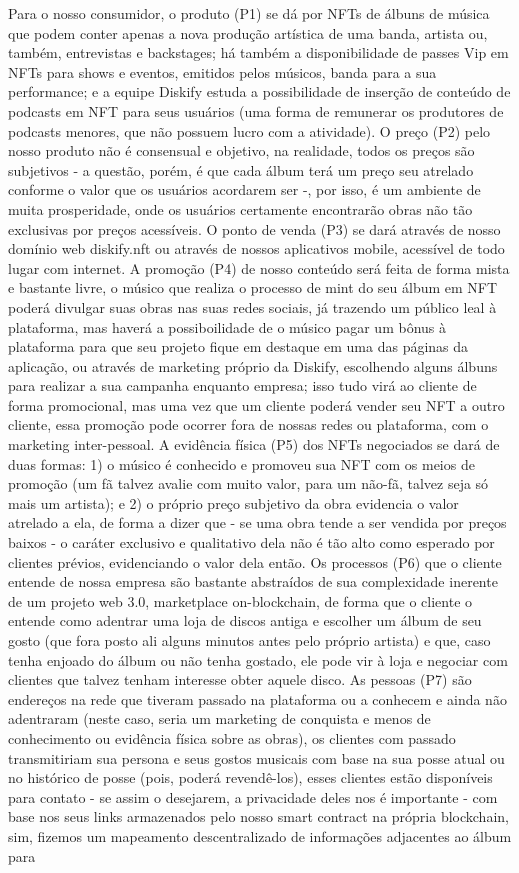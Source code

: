 \documentclass[onecolumn,12pt]{asme2ej}
\begin{document}
Para o nosso consumidor, o produto (P1) se dá por NFTs de álbuns de música que podem conter apenas a nova produção artística de uma banda, artista ou,  também, entrevistas e backstages; há também a disponibilidade de passes Vip em NFTs para shows e eventos, emitidos pelos músicos, banda para a sua performance; e a equipe Diskify estuda a possibilidade de inserção de conteúdo de podcasts em NFT para seus usuários (uma forma de remunerar os produtores de podcasts menores, que não possuem lucro com a atividade). O preço (P2) pelo nosso produto não é consensual e objetivo, na realidade, todos os preços são subjetivos - a questão, porém, é que cada álbum terá um preço seu atrelado conforme o valor que os usuários acordarem ser -, por isso, é um ambiente de muita prosperidade, onde os usuários certamente encontrarão obras não tão exclusivas por preços acessíveis. O ponto de venda (P3) se dará através de nosso domínio web diskify.nft ou através de nossos aplicativos mobile, acessível de todo lugar com internet. A promoção (P4) de nosso conteúdo será feita de forma mista e bastante livre, o músico que realiza o processo de mint do seu álbum em NFT poderá divulgar suas obras nas suas redes sociais, já trazendo um público leal à plataforma, mas haverá a possiboilidade de o músico pagar um bônus à plataforma para que seu projeto fique em destaque em uma das páginas da aplicação, ou através de marketing próprio da Diskify, escolhendo alguns álbuns para realizar a sua campanha enquanto empresa; isso tudo virá ao cliente de forma promocional, mas uma vez que um cliente poderá vender seu NFT a outro cliente, essa promoção pode ocorrer fora de nossas redes ou plataforma, com o marketing inter-pessoal. A evidência física (P5) dos NFTs negociados se dará de duas formas: 1) o músico é conhecido e promoveu sua NFT com os meios de promoção (um fã talvez avalie com muito valor, para um não-fã, talvez seja só mais um artista); e 2) o próprio preço subjetivo da obra evidencia o valor atrelado a ela, de forma a dizer que - se uma obra tende a ser vendida por preços baixos - o caráter exclusivo e qualitativo dela não é tão alto como esperado por clientes prévios, evidenciando o valor dela então. Os processos (P6) que o cliente entende de nossa empresa são bastante abstraídos de sua complexidade inerente de um projeto web 3.0, marketplace on-blockchain, de forma que o cliente o entende como adentrar uma loja de discos antiga e escolher um álbum de seu gosto (que fora posto ali alguns minutos antes pelo próprio artista) e que, caso tenha enjoado do álbum ou não tenha gostado, ele pode vir à loja e negociar com clientes que talvez tenham interesse obter aquele disco. As pessoas (P7) são endereços na rede que tiveram passado na plataforma ou a conhecem e ainda não adentraram (neste caso, seria um marketing de conquista e menos de conhecimento ou evidência física sobre as obras), os clientes com passado transmitiriam sua persona e seus gostos musicais com base na sua posse atual ou no histórico de posse (pois, poderá revendê-los), esses clientes estão disponíveis para contato - se assim o desejarem, a privacidade deles nos é importante - com base nos seus links armazenados pelo nosso smart contract na própria blockchain, sim, fizemos um mapeamento descentralizado de informações adjacentes ao álbum para 
\end{document}
